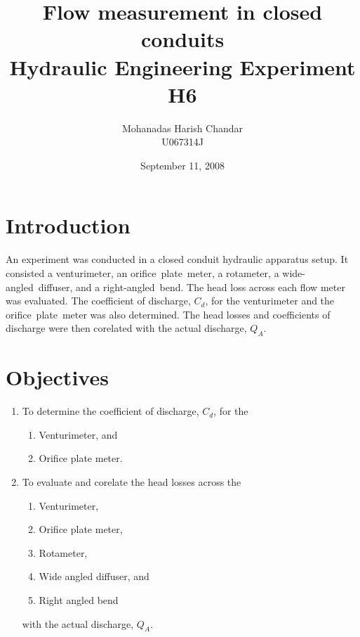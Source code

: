 \documentclass[a4paper]{article}
\title{
Flow measurement in closed conduits \\
\large{Hydraulic Engineering Experiment H6}}
\author{Mohanadas Harish Chandar \\
U067314J}
\date{September 11, 2008}
\begin{document}
\maketitle

\section{Introduction}
An experiment was conducted in a closed conduit hydraulic apparatus setup.
It consisted a venturimeter, an orifice~plate~meter, a rotameter,
a wide-angled~diffuser, and a right-angled~bend. 
The head loss across each flow meter was evaluated. 
The coefficient of discharge, $C_d$, for 
the venturimeter and the orifice~plate~meter was also determined.
The head losses and coefficients of discharge 
were then corelated with the actual discharge, $Q_A$.

\section{Objectives}
\begin{enumerate}
\item To determine the coefficient of discharge, $C_d$,
      for the
      \begin{enumerate}
      \item Venturimeter, and
      \item Orifice plate meter.
      \end{enumerate}
\item To evaluate and corelate the head losses across the 
      \begin{enumerate}
      \item Venturimeter,
      \item Orifice plate meter,
      \item Rotameter,
      \item Wide angled diffuser, and
      \item Right angled bend
      \end{enumerate}
      with the actual discharge, $Q_A$.
\end{enumerate}
\end{document}
